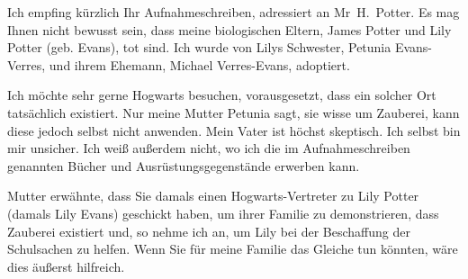 \begin{writtenNote}


Ich empfing kürzlich Ihr Aufnahmeschreiben, adressiert an Mr~H.~Potter. Es mag Ihnen nicht bewusst sein, dass meine biologischen Eltern, James Potter und Lily Potter (geb. Evans), tot sind. Ich wurde von Lilys Schwester, Petunia Evans-Verres, und ihrem Ehemann, Michael Verres-Evans, adoptiert.

Ich möchte sehr gerne Hogwarts besuchen, vorausgesetzt, dass ein solcher Ort tatsächlich existiert. Nur meine Mutter Petunia sagt, sie wisse um Zauberei, kann diese jedoch selbst nicht anwenden. Mein Vater ist höchst skeptisch. Ich selbst bin mir unsicher. Ich weiß außerdem nicht, wo ich die im Aufnahmeschreiben genannten Bücher und Ausrüstungsgegenstände erwerben kann.

Mutter erwähnte, dass Sie damals einen Hogwarts-Vertreter zu Lily Potter (damals Lily Evans) geschickt haben, um ihrer Familie zu demonstrieren, dass Zauberei existiert und, so nehme ich an, um Lily bei der Beschaffung der Schulsachen zu helfen. Wenn Sie für meine Familie das Gleiche tun könnten, wäre dies äußerst hilfreich.

\end{writtenNote}

